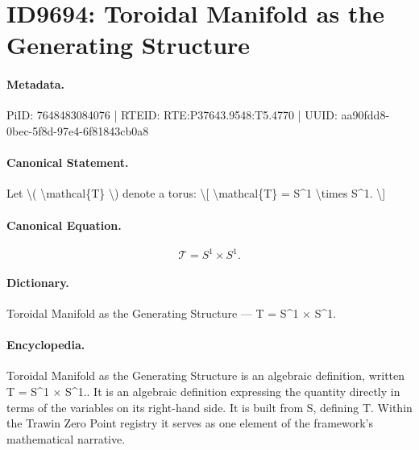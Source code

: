 \section*{ID9694: Toroidal Manifold as the Generating Structure}
\paragraph{Metadata.}
PiID: 7648483084076 | RTEID: RTE:P37643.9548:T5.4770 | UUID: aa90fdd8-0bec-5f8d-97e4-6f81843cb0a8

\paragraph{Canonical Statement.}
Let \textbackslash{}( \textbackslash{}mathcal\{T\} \textbackslash{}) denote a torus: \textbackslash{}[ \textbackslash{}mathcal\{T\} = S\textasciicircum{}1 \textbackslash{}times S\textasciicircum{}1. \textbackslash{}]

\paragraph{Canonical Equation.}
\[
\mathcal{T} = S^1 \times S^1.
\]

\paragraph{Dictionary.}
Toroidal Manifold as the Generating Structure — T = S\textasciicircum{}1 × S\textasciicircum{}1.

\paragraph{Encyclopedia.}
Toroidal Manifold as the Generating Structure is an algebraic definition, written T = S\textasciicircum{}1 × S\textasciicircum{}1.. It is an algebraic definition expressing the quantity directly in terms of the variables on its right-hand side. It is built from S, defining T. Within the Trawin Zero Point registry it serves as one element of the framework's mathematical narrative.
